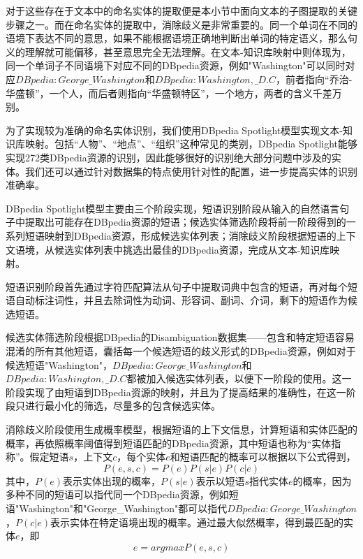 对于这些存在于文本中的命名实体的提取便是本小节中面向文本的子图提取的关键步骤之一。而在命名实体的提取中，消除歧义是非常重要的。同一个单词在不同的语境下表达不同的意思，如果不能根据语境正确地判断出单词的特定语义，那么句义的理解就可能偏移，甚至意思完全无法理解。在文本-知识库映射中则体现为，同一个单词子不同语境下对应不同的DBpedia资源，例如"Washington"可以同时对应$DBpedia:George\_Washington$和$DBpedia:Washington,\_D.C$，前者指向“乔治-华盛顿”，一个人，而后者则指向“华盛顿特区”，一个地方，两者的含义千差万别。

为了实现较为准确的命名实体识别，我们使用DBpedia Spotlight模型实现文本-知识库映射。包括“人物”、“地点”、“组织”这种常见的类别，DBpedia Spotlight能够实现272类DBpedia资源的识别，因此能够很好的识别绝大部分问题中涉及的实体。我们还可以通过针对数据集的特点使用针对性的配置，进一步提高实体的识别准确率。

DBpedia Spotlight模型主要由三个阶段实现，短语识别阶段从输入的自然语言句子中提取出可能存在DBpedia资源的短语；候选实体筛选阶段将前一阶段得到的一系列短语映射到DBpedia资源，形成候选实体列表；消除歧义阶段根据短语的上下文语境，从候选实体列表中挑选出最佳的DBpedia资源，完成从文本-知识库映射。

短语识别阶段首先通过字符匹配算法从句子中提取词典中包含的短语，再对每个短语自动标注词性，并且去除词性为动词、形容词、副词、介词，剩下的短语作为候选短语。

候选实体筛选阶段根据DBpedia的Disambiguation数据集——包含和特定短语容易混淆的所有其他短语，囊括每一个候选短语的歧义形式的DBpedia资源，例如对于候选短语"Washington"，$DBpedia:George\_Washington$和$DBpedia:Washington,\_D.C$都被加入候选实体列表，以便下一阶段的使用。这一阶段实现了由短语到DBpedia资源的映射，并且为了提高结果的准确性，在这一阶段只进行最小化的筛选，尽量多的包含候选实体。

消除歧义阶段使用生成概率模型，根据短语的上下文信息，计算短语和实体匹配的概率，再依照概率阈值得到短语匹配的DBpedia资源，其中短语也称为“实体指称”。假定短语$s$，上下文$c$，每个实体$e$和短语匹配的概率可以根据以下公式得到，
\begin{equation}
P(e,s,c) = P(e)P(s|e)P(c|e)
\end{equation}
其中，$P(e)$表示实体出现的概率，$P(s|e)$表示以短语$s$指代实体$e$的概率，因为多种不同的短语可以指代同一个DBpedia资源，例如短语"Washington"和"George\_Washington"都可以指代$DBpedia:George\_Washington$，$P(c|e)$表示实体在特定语境出现的概率。通过最大似然概率，得到最匹配的实体$e$，即
\begin{equation}
e = argmaxP(e,s,c)
\end{equation}

